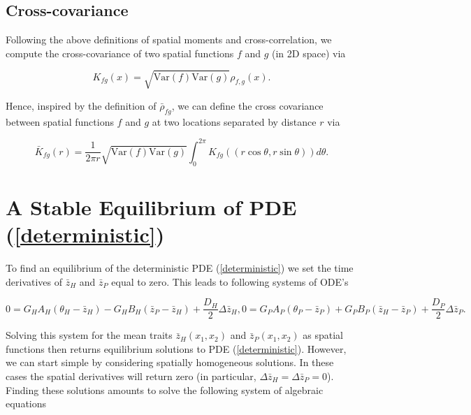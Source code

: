 \documentclass{article}
\begin{document}
\hypertarget{cross-covariance}{%
\subsection{Cross-covariance}\label{cross-covariance}}

Following the above definitions of spatial moments and
cross-correlation, we compute the cross-covariance of two spatial
functions \(f\) and \(g\) (in 2D space) via

\begin{equation}
  K_{fg}(x)=\sqrt{\mathrm{Var}(f)\mathrm{Var}(g)}\rho_{f,g}(x).
\end{equation}

Hence, inspired by the definition of \(\bar\rho_{fg}\), we can define
the cross covariance between spatial functions \(f\) and \(g\) at two
locations separated by distance \(r\) via

\begin{equation}
  \bar K_{fg}(r)=\frac{1}{2\pi r}\sqrt{\mathrm{Var}(f)\mathrm{Var}(g)}\int_0^{2\pi}K_{fg}((r\cos\theta,r\sin\theta))d\theta.
\end{equation}

\hypertarget{a-stable-equilibrium-of-pde}{%
\section{\texorpdfstring{A Stable Equilibrium of PDE
(\ref{deterministic})}{A Stable Equilibrium of PDE ()}}\label{a-stable-equilibrium-of-pde}}

To find an equilibrium of the deterministic PDE (\ref{deterministic}) we
set the time derivatives of \(\bar z_H\) and \(\bar z_P\) equal to zero.
This leads to following systems of ODE's

\begin{subequations}
  \begin{equation}
    0=G_HA_H(\theta_H-\bar z_H)-G_HB_H(\bar z_P-\bar z_H)+\frac{D_H}{2}\Delta\bar z_H,
  \end{equation}
  \begin{equation}
    0=G_PA_P(\theta_P-\bar z_P)+G_PB_P(\bar z_H-\bar z_P)+\frac{D_P}{2}\Delta\bar z_P.
  \end{equation}
\end{subequations}

Solving this system for the mean traits \(\bar z_H(x_1,x_2)\) and
\(\bar z_P(x_1,x_2)\) as spatial functions then returns equilibrium
solutions to PDE (\ref{deterministic}). However, we can start simple by
considering spatially homogeneous solutions. In these cases the spatial
derivatives will return zero (in particular,
\(\Delta\bar z_H=\Delta\bar z_P=0\)). Finding these solutions amounts to
solve the following system of algebraic equations
\end{document}
